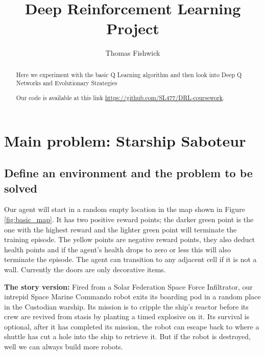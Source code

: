 \documentclass[a4pape, 11pt, english]{article}
\begin{document}
\title{Deep Reinforcement Learning Project}
\author{Thomas Fishwick}
\date{} %
\maketitle

\begin{abstract}
Here we experiment with the basic Q Learning algorithm and then look into Deep Q Networks and Evolutionary Strategies

Our code is available at this link \url{https://github.com/SL477/DRL-coursework}.
\end{abstract}

\section{Main problem: Starship Saboteur}
\subsection{Define an environment and the problem to be solved}


Our agent will start in a random empty location in the map shown in Figure \ref{fig:basic_map}. It has two positive reward points; the darker green point is the one with the highest reward and the lighter green point will terminate the training episode. The yellow points are negative reward points, they also deduct health points and if the agent's health drops to zero or less this will also terminate the episode. The agent can transition to any adjacent cell if it is not a wall. Currently the doors are only decorative items.

\textbf{The story version:}
Fired from a Solar Federation Space Force Infiltrator, our intrepid Space Marine Commando robot exits its boarding pod in a random place in the Custodian warship. Its mission is to cripple the ship's reactor before its crew are revived from stasis by planting a timed explosive on it. Its survival is optional, after it has completed its mission, the robot can escape back to where a shuttle has cut a hole into the ship to retrieve it. But if the robot is destroyed, well we can always build more robots.
\end{document}
